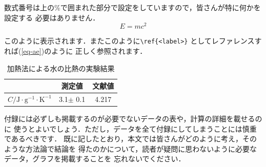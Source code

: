 \documentclass[a4paper,10pt]{jsarticle}
\def\rm#1{\mathrm{#1}}
\begin{document}
数式番号は上の\%で囲まれた部分で設定をしていますので，皆さんが特に何かを設定する
必要はありません．
\begin{equation}
 E=mc^2
 \label{eq-ae}
 \end{equation}

このように表示されます．またこのように\verb|\ref{<label>}| としてレファレンスすれば(\ref{eq-ae})のように
正しく参照されます．

%
\begin{table}[ht]
\begin{center}
\caption{加熱法による水の比熱の実験結果}
\label{tabA1}
\begin{tabular}{ccc}\hline
 & 測定値 & 文献値 \\ \hline
$C/\rm{J \cdot g^{-1} \cdot K^{-1}} $ &  3.1$\pm$ 0.1 & 4.217 \\ \hline
\end{tabular}
\end{center}
\end{table}

付録には必ずしも掲載するのが必要でないデータの表や，計算の詳細を載せるのに
使うとよいでしょう．ただし，データを全て付録にしてしまうことには慎重であるべきです．
既に記したとおり，本文では皆さんがどのように考え，そのような方法論で結論を
得たのかについて，読者が疑問に思わないように必要なデータ，グラフを掲載することを
忘れないでください．

\end{document}
